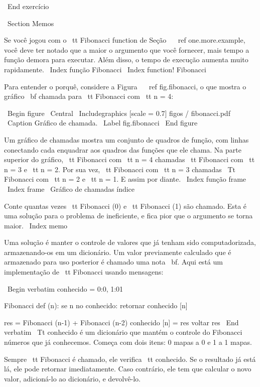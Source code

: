 \documentclass[10pt]{book}
\begin{document}
{{{{{{{\ End {} exercício


\ Section {} Memos

Se você jogou com o {\ tt Fibonacci} function de
Seção ~ \ ref {} one.more.example, você deve ter notado que a maior
o argumento que você fornecer, mais tempo a função demora para executar.
Além disso, o tempo de execução aumenta muito rapidamente.
\ Index {função Fibonacci}
\ Index {function! Fibonacci}

Para entender o porquê, considere a Figura ~ \ ref {} fig.fibonacci, o que mostra
o gráfico {\ bf chamada} para {\ tt Fibonacci} com {\ tt n = 4}:

\ Begin {figure}
\ Central
{\ Includegraphics [scale = 0.7] {figos / fibonacci.pdf}}
\ Caption {Gráfico de chamada.}
\ Label {} fig.fibonacci
\ End {figure}

Um gráfico de chamadas mostra um conjunto de quadros de função, com linhas conectando cada
enquadrar aos quadros das funções que ele chama. Na parte superior do
gráfico, {\ tt Fibonacci} com {\ tt n = 4} chamadas {\ tt Fibonacci} com {\ tt
n = 3} e {\ tt n = 2}. Por sua vez, {\ tt Fibonacci} com {\ tt n = 3} chamadas
{\ Tt Fibonacci} com {\ tt n = 2} e {\ tt n = 1}. E assim por diante.
\ Index {função frame}
\ Index {frame}
\ {Gráfico de chamadas} índice

Conte quantas vezes {\ tt Fibonacci (0)} e {\ tt Fibonacci (1)} são
chamado. Esta é uma solução para o problema de ineficiente, e fica
pior que o argumento se torna maior.
\ Index {memo}

Uma solução é manter o controle de valores que já tenham sido
computadorizada, armazenando-os em um dicionário. Um valor previamente calculado
que é armazenado para uso posterior é chamado uma nota {\ bf}. Aqui está um
implementação de {\ tt Fibonacci} usando mensagens:

\ Begin {verbatim}
conhecido = {0:0, 1:01}

Fibonacci def (n):
    se n no conhecido:
        retornar conhecido [n]

    res = Fibonacci (n-1) + Fibonacci (n-2)
    conhecido [n] = res
    voltar res
\ End {verbatim}
%
{\ Tt conhecido} é um dicionário que mantém o controle do Fibonacci
números que já conhecemos. Começa com
dois itens: 0 mapas a 0 e 1 a 1 mapas.

Sempre {\ tt Fibonacci} é chamado, ele verifica {\ tt conhecido}.
Se o resultado já está lá, ele pode retornar
imediatamente. Caso contrário, ele tem que
calcular o novo valor, adicioná-lo ao dicionário, e devolvê-lo.

}}}}}}}
\end{document}
